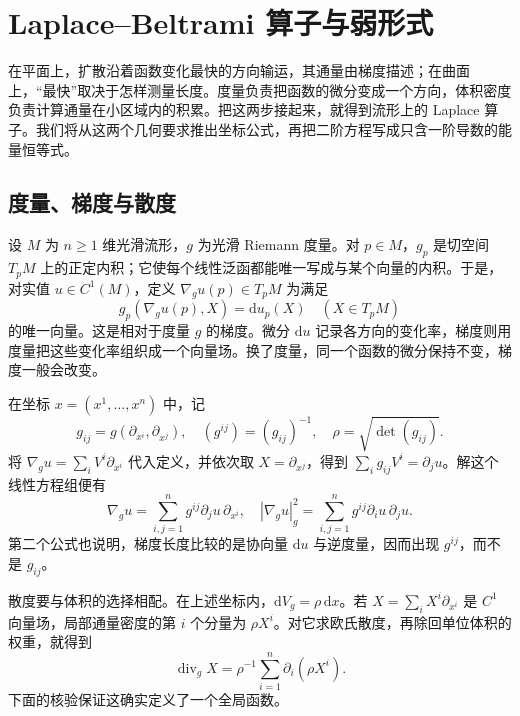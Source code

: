 \section{Laplace–Beltrami 算子与弱形式}
\label{b2:sec:2602}

在平面上，扩散沿着函数变化最快的方向输运，其通量由梯度描述；在曲面上，“最快”取决于怎样测量长度。度量负责把函数的微分变成一个方向，体积密度负责计算通量在小区域内的积累。把这两步接起来，就得到流形上的 Laplace 算子。我们将从这两个几何要求推出坐标公式，再把二阶方程写成只含一阶导数的能量恒等式。

\subsection{度量、梯度与散度}
\label{b2:subsec:260201}

设 \(M\) 为 \(n\geq1\) 维光滑流形，\(g\) 为光滑 Riemann 度量。对 \(p\in M\)，\(g_p\) 是切空间 \(T_pM\) 上的正定内积；它使每个线性泛函都能唯一写成与某个向量的内积。于是，对实值 \(u\in C^1(M)\)，定义 \(\nabla_g u(p)\in T_pM\) 为满足
\[
 g_p(\nabla_g u(p),X)=\mathrm du_p(X)
 \quad(X\in T_pM)
\]
的唯一向量。这是相对于度量 \(g\) 的梯度。微分 \(\mathrm du\) 记录各方向的变化率，梯度则用度量把这些变化率组织成一个向量场。换了度量，同一个函数的微分保持不变，梯度一般会改变。

在坐标 \(x=(x^1,\ldots,x^n)\) 中，记
\[
 g_{ij}=g(\partial_{x^i},\partial_{x^j}),
 \quad (g^{ij})=(g_{ij})^{-1},
 \quad \rho=\sqrt{\det(g_{ij})}.
\]
将 \(\nabla_g u=\sum_i V^i\partial_{x^i}\) 代入定义，并依次取 \(X=\partial_{x^j}\)，得到
\(\sum_i g_{ij}V^i=\partial_j u\)。解这个线性方程组便有
\begin{equation}
\label{b2:eq:26-gradient-coordinate}
 \nabla_g u=\sum_{i,j=1}^n g^{ij}\partial_j u\,\partial_{x^i},
 \quad
 |\nabla_g u|_g^2=\sum_{i,j=1}^n g^{ij}\partial_i u\,\partial_j u.
\end{equation}
第二个公式也说明，梯度长度比较的是协向量 \(\mathrm du\) 与逆度量，因而出现 \(g^{ij}\)，而不是 \(g_{ij}\)。

散度要与体积的选择相配。在上述坐标内，\(\mathrm dV_g=\rho\,\mathrm dx\)。若 \(X=\sum_i X^i\partial_{x^i}\) 是 \(C^1\) 向量场，局部通量密度的第 \(i\) 个分量为 \(\rho X^i\)。对它求欧氏散度，再除回单位体积的权重，就得到
\begin{equation}
\label{b2:eq:26-divergence-coordinate}
 \operatorname{div}_g X
 =\rho^{-1}\sum_{i=1}^n\partial_i(\rho X^i).
\end{equation}
下面的核验保证这确实定义了一个全局函数。

